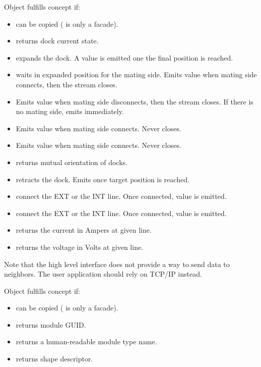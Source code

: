 \noindent Object  fulfills concept  if:
\begin{itemize}
    \item {} can be copied ( is only a facade).
    \item {} returns dock current state.
    \item {} expands the dock. A value is
    emitted one the final position is reached.
    \item {} waits in expanded position
    for the mating side. Emits value when mating side connects, then the stream
    closes.
    \item {} Emits value when mating
    side disconnects, then the stream closes. If there is no mating side, emits
    immediately.
    \item {} Emits value when mating side
    connects. Never closes.
    \item {} Emits value when mating side
    connects. Never closes.
    \item {} returns
    mutual orientation of docks.
    \item {} retracts the dock. Emits once
    target position is reached.
    \item {} connect the EXT or the
    INT line. Once connected, value is emitted.
    \item {} connect the EXT or
    the INT line. Once connected, value is emitted.
    \item {} returns the current in
    Ampers at given line.
    \item {} returns the voltage in
    Volts at given line.
\end{itemize}
Note that the high level interface does not provide a way to send data to
neighbors. The user application should rely on TCP/IP instead.

Object  fulfills concept  if:
\begin{itemize}
    \item {} can be copied ( is only a facade).
    \item {} returns module GUID.
    \item {} returns a human-readable
    module type name.
    \item {} returns shape
    descriptor.
\end{itemize}